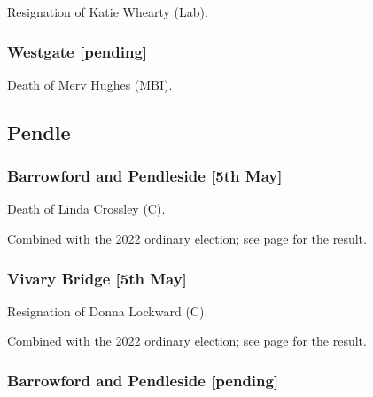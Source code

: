 \documentclass[a4paper,openany]{book}
\begin{document}
\begin{resultsiii}
Resignation of Katie Whearty (Lab).

\subsubsection*{Westgate \hspace*{\fill}\nolinebreak[1]%
	\enspace\hspace*{\fill}
	[pending]}


Death of Merv Hughes (MBI).

\subsection*{Pendle}

\subsubsection*{Barrowford and Pendleside \hspace*{\fill}\nolinebreak[1]%
	\enspace\hspace*{\fill}
	[5th May]}


Death of Linda Crossley (C).

Combined with the 2022 ordinary election; see page \pageref{PendleBarrowfordPendleside} for the result.

\subsubsection*{Vivary Bridge \hspace*{\fill}\nolinebreak[1]%
	\enspace\hspace*{\fill}
	[5th May]}


Resignation of Donna Lockward (C).

Combined with the 2022 ordinary election; see page \pageref{PendleVivaryBridge} for the result.

\subsubsection*{Barrowford and Pendleside \hspace*{\fill}\nolinebreak[1]%
	\enspace\hspace*{\fill}
	[pending]}


\end{resultsiii}
\end{document}
